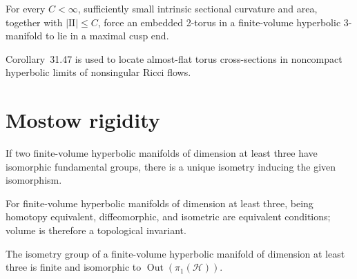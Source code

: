 \begin{corollary}
\label{cor:chow-iv-small-almost-flat-tori}
For every \(C<\infty\), sufficiently small intrinsic sectional curvature and
area, together with \(|\mathrm{II}|\le C\), force an embedded 2-torus in a
finite-volume hyperbolic 3-manifold to lie in a maximal cusp end.
\end{corollary}

\begin{remark}
\label{rem:chow-iv-small-tori-application}
Corollary~31.47 is used to locate almost-flat torus cross-sections in noncompact
hyperbolic limits of nonsingular Ricci flows.
\end{remark}

\section{Mostow rigidity}

\begin{theorem}
\label{thm:chow-iv-mostow-rigidity}
If two finite-volume hyperbolic manifolds of dimension at least three have
isomorphic fundamental groups, there is a unique isometry inducing the given
isomorphism.
\end{theorem}

\begin{corollary}
\label{cor:chow-iv-mostow-equivalences}
For finite-volume hyperbolic manifolds of dimension at least three, being
homotopy equivalent, diffeomorphic, and isometric are equivalent conditions;
volume is therefore a topological invariant.
\end{corollary}

\begin{corollary}
\label{cor:chow-iv-isometry-group}
The isometry group of a finite-volume hyperbolic manifold of dimension at least
three is finite and isomorphic to \(\operatorname{Out}(\pi_1(\mathcal H))\).
\end{corollary}

